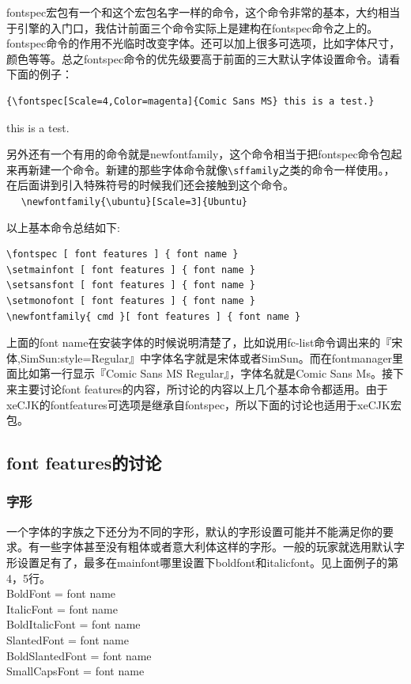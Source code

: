\documentclass[11pt,oneside]{book}
\begin{document}
\begin{common-format}
fontspec宏包有一个和这个宏包名字一样的命令，这个命令非常的基本，大约相当于引擎的入门口，我估计前面三个命令实际上是建构在fontspec命令之上的。fontspec命令的作用不光临时改变字体。还可以加上很多可选项，比如字体尺寸，颜色等等。总之fontspec命令的优先级要高于前面的三大默认字体设置命令。请看下面的例子：
\begin{Verbatim}
{\fontspec[Scale=4,Color=magenta]{Comic Sans MS} this is a test.} 
\end{Verbatim}
{ this is a test.} 

另外还有一个有用的命令就是newfontfamily，这个命令相当于把fontspec命令包起来再新建一个命令。新建的那些字体命令就像\verb+\sffamily+之类的命令一样使用。，在后面讲到引入特殊符号的时候我们还会接触到这个命令。\\　
\verb+\newfontfamily{\ubuntu}[Scale=3]{Ubuntu}+

以上基本命令总结如下:
\newpage
\begin{Verbatim}
\fontspec [ font features ] { font name }
\setmainfont [ font features ] { font name }
\setsansfont [ font features ] { font name }
\setmonofont [ font features ] { font name }
\newfontfamily{ cmd }[ font features ] { font name }
\end{Verbatim}
上面的font name在安装字体的时候说明清楚了，比如说用fc-list命令调出来的『宋体,SimSun:style=Regular』中字体名字就是宋体或者SimSun。而在fontmanager里面比如第一行显示『Comic Sans MS Regular』，字体名就是Comic Sans Ms。接下来主要讨论font features的内容，所讨论的内容以上几个基本命令都适用。由于xeCJK的fontfeatures可选项是继承自fontspec，所以下面的讨论也适用于xeCJK宏包。

\subsection{font features的讨论}
\subsubsection{字形}
一个字体的字族之下还分为不同的字形，默认的字形设置可能并不能满足你的要求。有一些字体甚至没有粗体或者意大利体这样的字形。一般的玩家就选用默认字形设置足有了，最多在mainfont哪里设置下boldfont和italicfont。见上面例子的第4，5行。\\
BoldFont = font name\\
ItalicFont = font name\\
BoldItalicFont = font name\\
SlantedFont = font name\\
BoldSlantedFont = font name\\
SmallCapsFont = font name


\end{common-format}
\end{document}
